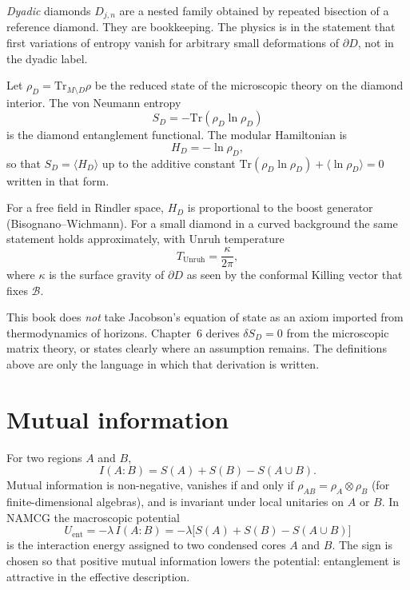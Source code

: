 \emph{Dyadic} diamonds \(D_{j,n}\) are a nested family obtained by
repeated bisection of a reference diamond. They are bookkeeping. The
physics is in the statement that first variations of entropy vanish
for arbitrary small deformations of \(\partial D\), not in the dyadic
label.

\begin{definition}
  \label{def:SD}
  Let \(\rho_D=\mathrm{Tr}_{M\setminus D}\rho\) be the reduced state
  of the microscopic theory on the diamond interior. The von Neumann
  entropy
  \begin{equation}
    \label{eq:vonneumann}
    S_D=-\mathrm{Tr}(\rho_D\ln\rho_D)
  \end{equation}
  is the diamond entanglement functional. The modular Hamiltonian is
  \begin{equation}
    \label{eq:modular}
    H_D=-\ln\rho_D,
  \end{equation}
  so that \(S_D=\langle H_D\rangle\) up to the additive constant
  \(\mathrm{Tr}(\rho_D\ln\rho_D)+\langle\ln\rho_D\rangle=0\) written
  in that form.
\end{definition}

For a free field in Rindler space, \(H_D\) is proportional to the
boost generator (Bisognano--Wichmann). For a small diamond in a
curved background the same statement holds approximately, with
Unruh temperature
\begin{equation}
  \label{eq:unruh}
  T_{\mathrm{Unruh}}=\frac{\kappa}{2\pi},
\end{equation}
where \(\kappa\) is the surface gravity of \(\partial D\) as seen by
the conformal Killing vector that fixes \(\mathcal{B}\).

This book does \emph{not} take Jacobson's equation of state as an
axiom imported from thermodynamics of horizons. Chapter~6 derives
\(\delta S_D=0\) from the microscopic matrix theory, or states
clearly where an assumption remains. The definitions above are
only the language in which that derivation is written.

\section{Mutual information}
\label{sec:ch2-MI}

For two regions \(A\) and \(B\),
\begin{equation}
  \label{eq:MI}
  I(A:B)=S(A)+S(B)-S(A\cup B).
\end{equation}
Mutual information is non-negative, vanishes if and only if
\(\rho_{AB}=\rho_A\otimes\rho_B\) (for finite-dimensional algebras),
and is invariant under local unitaries on \(A\) or \(B\). In NAMCG the
macroscopic potential
\begin{equation}
  \label{eq:Uent}
  U_{\mathrm{ent}}
  =-\lambda\,I(A:B)
  =-\lambda\bigl[S(A)+S(B)-S(A\cup B)\bigr]
\end{equation}
is the interaction energy assigned to two condensed cores \(A\) and
\(B\). The sign is chosen so that positive mutual information lowers
the potential: entanglement is attractive in the effective
description.

